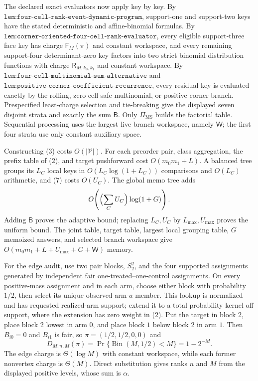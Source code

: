 The declared exact evaluators now apply key by key. By \(\texttt{lem:four-cell-rank-event-dynamic-program}\), support-one and support-two keys have the stated deterministic and affine-binomial formulas. By \(\texttt{lem:corner-oriented-four-cell-rank-evaluator}\), every eligible support-three face key has charge \(\mathsf F_M(\pi)\) and constant workspace, and every remaining support-four determinant-zero key factors into two strict binomial distribution functions with charge \(\mathsf R_{M,k_0,k_1}\) and constant workspace. By \(\texttt{lem:four-cell-multinomial-sum-alternative}\) and \(\texttt{lem:positive-corner-coefficient-recurrence}\), every residual key is evaluated exactly by the rolling, zero-cell-safe multinomial, or positive-corner branch. Prespecified least-charge selection and tie-breaking give the displayed seven disjoint strata and exactly the sum \(\mathsf B\). Only \(\Pi_{\mathrm{MS}}\) builds the factorial table. Sequential processing uses the largest live branch workspace, namely \(\mathsf W\); the first four strata use only constant auxiliary space.

Constructing (3) costs \(O(|\mathcal V|)\). For each preorder pair, class aggregation, the prefix table of (2), and target pushforward cost \(O(m_0m_1+L)\). A balanced tree groups its \(L_C\) local keys in \(O(L_C\log(1+L_C))\) comparisons and \(O(L_C)\) arithmetic, and (7) costs \(O(U_C)\). The global memo tree adds
\[
O\!\left(\Bigl(\sum_CU_C\Bigr)\log(1+G)\right).
\]
Adding \(\mathsf B\) proves the adaptive bound; replacing \(L_C,U_C\) by \(L_{\max},U_{\max}\) proves the uniform bound. The joint table, target table, largest local grouping table, \(G\) memoized answers, and selected branch workspace give \(O(m_0m_1+L+U_{\max}+G+\mathsf W)\) memory.

For the edge audit, use two pair blocks, \(S_2^2\), and the four supported assignments generated by independent fair one-treated--one-control assignments. On every positive-mass assignment and in each arm, choose either block with probability \(1/2\), then select its unique observed arm-\(a\) member. This lookup is normalized and has requested realized-arm support; extend it to a total probability kernel off support, where the extension has zero weight in (2). Put the target in block \(2\), place block \(2\) lowest in arm \(0\), and place block \(1\) below block \(2\) in arm \(1\). Then \(B_{i0}=0\) and \(B_{i1}\) is fair, so \(\pi=(1/2,1/2,0,0)\) and
\[
D_{M,n,M}(\pi)=\Pr\{\operatorname{Bin}(M,1/2)<M\}=1-2^{-M}.
\]
The edge charge is \(\Theta(\log M)\) with constant workspace, while each former nonvertex charge is \(\Theta(M)\). Direct substitution gives ranks \(n\) and \(M\) from the displayed positive levels, whose sum is \(\alpha\).

